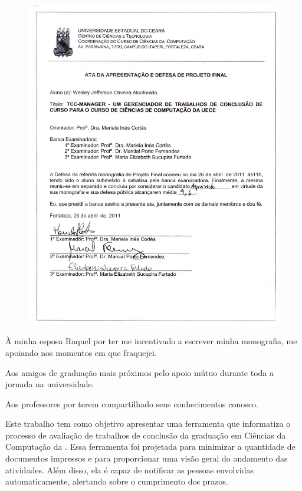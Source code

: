\documentclass[pnumabnt,normaltoc,espacoumemeio,capchap]{abnt}
\begin{document}
\capa
\folhaderosto
\makecippage

\clearpage
\begin{figure}[htbp]
\centering
\includegraphics[width=1\textwidth]{fig/ata_defesa.jpg}
\end{figure}


À minha esposa Raquel por ter me incentivado a escrever minha monografia, me apoiando nos
momentos em que fraquejei.

Aos amigos de graduação mais próximos pelo apoio mútuo durante toda a jornada na universidade.

Aos professores por terem compartilhado seus conhecimentos conosco.
\pagebreak

\makeepigrafe


\begin{resumo}
\noindent
Este trabalho tem como objetivo apresentar uma ferramenta que informatiza
o processo de avaliação de trabalhos de conclusão da graduação em Ciências
da Computação da . Essa ferramenta foi projetada
para minimizar a quantidade de documentos impressos e para proporcionar uma
visão geral do andamento das atividades. Além disso, ela é capaz de notificar
as pessoas envolvidas automaticamente, alertando sobre o cumprimento dos prazos.

\noindent
\palavraschave
\end{resumo}
\pagebreak
\end{document}
